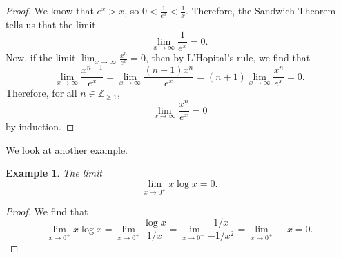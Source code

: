 \documentclass[a4paper, openany]{memoir}
\theoremstyle{definition}
\theoremstyle{plain}
\newtheorem{example}[definition]{Example}
\begin{document}
\begin{proof}
We know that $e^x > x$, so $0 < \frac{1}{e^x} < \frac{1}{x}$. Therefore, the Sandwich Theorem tells us that the limit
\[\lim_{x \to \infty} \frac{1}{e^x} = 0.\]
Now, if the limit $\lim_{x \to \infty} \frac{x^n}{e^x} = 0$, then by L'Hopital's rule, we find that
\[\lim_{x \to \infty} \frac{x^{n+1}}{e^x} = \lim_{x \to \infty} \frac{(n+1)x^n}{e^x} = (n+1) \lim_{x \to \infty} \frac{x^n}{e^x} = 0.\]
Therefore, for all $n \in \mathbb{Z}_{\geqslant 1}$,
\[\lim_{x \to \infty} \frac{x^n}{e^x} = 0\]
by induction.
\end{proof}
\noindent We look at another example.
\begin{example}
The limit
\[\lim_{x \to 0^+} x \log x = 0.\]
\end{example}
\begin{proof}
We find that
\[\lim_{x \to 0^+} x \log x = \lim_{x \to 0^+} \frac{\log x}{1/x} = \lim_{x \to 0^+} \frac{1/x}{-1/x^2} = \lim_{x \to 0^+} - x = 0.\]
\end{proof}
\end{document}
